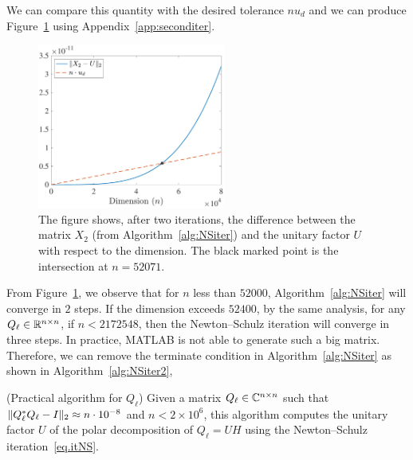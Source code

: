 We can compare this quantity with the desired tolerance $nu_d$ and we can produce Figure~\ref{fig:seconditer} using Appendix~\ref{app:seconditer}.
\begin{figure}[ht]
\centering
\includegraphics[width=0.55\textwidth]{figs/second_iter.pdf}
\caption[The difference between the iterator $X_2$ and the unitary factor $U$ against the dimension $n$.]{The figure shows, after two iterations, the difference between the matrix $X_2$ (from Algorithm~\ref{alg:NSiter}) and the unitary factor $U$ with respect to the dimension. The black marked point is the intersection at $n = 52071$.}
\label{fig:seconditer}
\end{figure}

From Figure~\ref{fig:seconditer}, we observe that for $n$ less than $52000$, Algorithm~\ref{alg:NSiter} will converge in $2$ steps. If the dimension exceeds $52400$, by the same analysis, for any $Q_\ell\in\mathbb{R}^{n\times n}$, if $n < 2172548$, then the Newton--Schulz iteration will converge in three steps. In practice, MATLAB is not able to generate such a big matrix. Therefore, we can remove the terminate condition in Algorithm~\ref{alg:NSiter} as shown in Algorithm~\ref{alg:NSiter2},

\begin{algorithm}[ht]
    \caption{(Practical algorithm for $Q_\ell$) Given a matrix $Q_\ell\in\mathbb{C}^{n\times n}$ such that $\|{Q_\ell^* Q_\ell - I}\|_2 \approx n\cdot 10^{-8}$ and $n < 2\times 10^6$, this algorithm computes the unitary factor $U$ of the polar decomposition of $Q_\ell = UH$ using the Newton--Schulz iteration~\eqref{eq.itNS}.}
    \label{alg:NSiter2}
    \begin{algorithmic}[1]
        \Else 
        \EndIf
        \EndFor
    \end{algorithmic}
    \end{algorithm}

